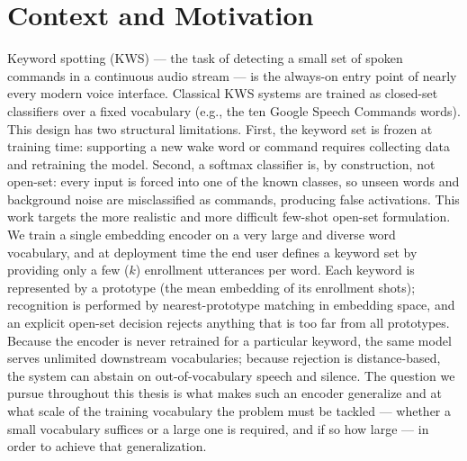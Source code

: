 \documentclass[12pt,a4paper]{report}
\begin{document}
\section{Context and Motivation}\label{sec:context}

Keyword spotting (KWS) --- the task of detecting a small set of spoken commands
in a continuous audio stream --- is the always-on entry point of nearly every
modern voice interface. Classical KWS systems are trained as closed-set
classifiers over a fixed vocabulary (e.g., the ten Google Speech Commands words).
This design has two structural limitations. First, the keyword set is frozen at
training time: supporting a new wake word or command requires collecting data and
retraining the model. Second, a softmax classifier is, by construction, not
open-set: every input is forced into one of the known classes, so unseen words
and background noise are misclassified as commands, producing false
activations. This work targets the more realistic and more difficult few-shot
open-set formulation. We train a single embedding encoder on a very large and
diverse word vocabulary, and at deployment time the end user defines a
keyword set by providing only a few ($k$) enrollment utterances per word. Each
keyword is represented by a prototype (the mean embedding of its enrollment
shots); recognition is performed by nearest-prototype matching in embedding
space, and an explicit open-set decision rejects anything that is too far from
all prototypes. Because the encoder is never retrained for a particular keyword,
the same model serves unlimited downstream vocabularies; because rejection is
distance-based, the system can abstain on out-of-vocabulary speech and silence.
The question we pursue throughout this thesis is what makes such an encoder
generalize and at what scale of the training vocabulary the
problem must be tackled --- whether a small vocabulary suffices or a large one is
required, and if so how large --- in order to achieve that generalization.
\end{document}
